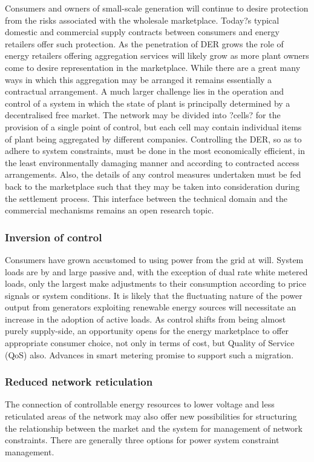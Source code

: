 Consumers and owners of small-scale generation will continue to desire
protection from the risks associated with the wholesale marketplace.  Today?s
typical domestic and commercial supply contracts between consumers and energy
retailers offer such protection.  As the penetration of DER grows the role of
energy retailers offering aggregation services will likely grow as more plant
owners come to desire representation in the marketplace.  While there are a
great many ways in which this aggregation may be arranged it remains
essentially a contractual arrangement. A much larger challenge lies in the
operation and control of a system in which the state of plant is principally
determined by a decentralised free market.  The network may be divided
into ?cells? for the provision of a single point of control, but each cell may
contain individual items of plant being aggregated by different companies.
Controlling the DER, so as to adhere to system constraints, must be done in
the most economically efficient, in the least environmentally damaging manner
and according to contracted access arrangements.  Also, the details of any
control measures undertaken must be fed back to the marketplace such that they
may be taken into consideration during the settlement process.  This interface
between the technical domain and the commercial mechanisms remains an open
research topic.

\subsubsection{Inversion of control}
Consumers have grown accustomed to using power from the grid at will.  System
loads are by and large passive and, with the exception of dual rate white
metered loads, only the largest make adjustments to their consumption
according to price signals or system conditions.  It is likely that the
fluctuating nature of the power output from generators exploiting renewable
energy sources will necessitate an increase in the adoption of active loads.
As control shifts from being almost purely supply-side, an opportunity opens
for the energy marketplace to offer appropriate consumer choice, not only in
terms of cost, but Quality of Service (QoS) also. Advances in smart metering
promise to support such a migration.

\subsubsection{Reduced network reticulation}
The connection of controllable energy resources to lower voltage and less
reticulated areas of the network may also offer new possibilities for
structuring the relationship between the market and the system for management
of network constraints.  There are generally three options for power system
constraint management.


